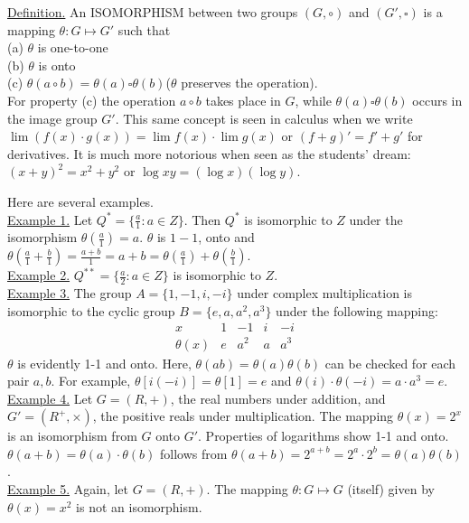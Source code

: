 \documentclass[12pt]{book}
\theoremstyle{definition}
\begin{document}
\underline{Definition.} An ISOMORPHISM between two groups $(G,\circ)$ and $(G',\square)$ is a mapping $\theta:G\mapsto G'$ such that\\
(a) $\theta$ is one-to-one\\
(b) $\theta$ is onto\\
(c) $\theta(a\circ b)=\theta(a)\square\theta(b)$\quad($\theta$ preserves the operation).\\
For property (c) the operation $a\circ b$ takes place in $G$, while $\theta(a)\square\theta(b)$ occurs in the image group $G'$.  This same concept is seen in calculus when we write $\lim(f(x)\cdot g(x)) = \lim f(x)\cdot \lim g(x)$ or $(f+g)'=f'+g'$ for derivatives.  It is much more notorious when seen as the students' dream: $(x+y)^2=x^2+y^2$ or $\log xy =(\log x)(\log y)$.

Here are several examples.\\
\underline{Example 1.} Let $Q^*=\{\frac{a}{1}:a\in Z\}$.  Then $Q^*$ is isomorphic to $Z$ under the isomorphism $\theta(\frac{a}{1})=a$.  $\theta$ is $1-1$, onto and $\theta(\frac{a}{1}+\frac{b}{1})=\frac{a+b}{1}=a+b=\theta(\frac{a}{1})+\theta(\frac{b}{1})$.\\[.1in]
\underline{Example 2.} $Q^{**}=\{\frac{a}{2}:a\in Z\}$ is isomorphic to $Z$.\\[.1in]
\underline{Example 3.} The group $A=\{1,-1,i,-i\}$ under complex multiplication is isomorphic to the cyclic group $B=\{e,a,a^2,a^3\} $ under the following mapping:
$$\begin{array}{c|cccc}
x&1&-1&i&-i\\
\hline
\theta(x)&e&a^2&a&a^3
\end{array}$$
$\theta$ is evidently 1-1 and onto.  Here, $\theta(ab)=\theta(a)\theta(b)$ can be checked for each pair $a,b$.  For example, $\theta[i(-i)]=\theta[1]=e$ and $\theta(i)\cdot\theta(-i)=a\cdot a^3=e$.\\[.1in]
\underline{Example 4.} Let $G=(R,+)$, the real numbers under addition, and $G'=(R^+,\times)$, the positive reals under multiplication.  The mapping $\theta(x)=2^x$ is an isomorphism from $G$ onto $G'$.  Properties of logarithms show 1-1 and onto.  $\theta(a+b)=\theta(a)\cdot\theta(b)$ follows from $\theta(a+b)=2^{a+b}=2^a\cdot2^b = \theta(a)\theta(b)$.\\[.1in]
\underline{Example 5.} Again, let $G=(R,+)$. The mapping $\theta:G\mapsto G$ (itself) given by $\theta(x)=x^2$ is not an isomorphism.
\end{document}
